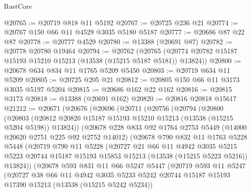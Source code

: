 \begin{lexlean}{RustCore}
\begin{coremodule}
@20765 := @20719 @818 @11 @5192
@20767 := @20725 @236 @21
@20774 := @20767 @150 @66 @11 @4529 @3035 @5180 @5187
@20777 := @20686 @87 @22 @87
@20778 := @20777 @4529
@20780 := @13388 (@20691 @87)
@20782 := @20778 @20780 @19464
@20794 := @20762
    (@20765 (@20774 @20782 @15187 @15193 @15210 @15213 (@13538 (@15215 @5187 @5181)) @13824))
@20800 := @20678 @634 @834 @11 @1765 @5209 @5450
@20803 := @20719 @634 @11 @5209
@20805 := @20725 @205 @21
@20812 := @20805 @150 @66 @11 @3173 @3035 @5197 @5204
@20815 := @20686 @162 @22 @162
@20816 := @20815 @3173
@20818 := @13388 (@20691 @162)
@20820 := @20816 @20818 @15617
@21212 := @20671
    (@20676
      (@20696
        (@20711
          (@20756
            (@20794
              (@20800
                (@20803
                  (@20812 @20820 @15187 @15193 @15210 @15213 (@13538 (@15215 @5204 @5198)) @13824))
                (@20678
                  @228
                  @833
                  @92
                  @1764
                  @2753
                  @5449
                  (@14000 @20620 @2751 @225 @92 @2752 @14012)
                  (@20678
                    @790
                    @832
                    @11
                    @1763
                    @5228
                    @5448
                    (@20719
                      @790
                      @11
                      @5228
                      (@20727
                        @21
                        @66
                        @11
                        @4942
                        @3035
                        @5215
                        @5223
                        @20744
                        @15187
                        @15193
                        @15853
                        @15213
                        (@13538 (@15215 @5223 @5216))
                        @13824))
                    (@20678
                      @593
                      @831
                      @11
                      @66
                      @5247
                      @5447
                      (@20719
                        @593
                        @11
                        @5247
                        (@20727
                          @38
                          @66
                          @11
                          @4942
                          @3035
                          @5233
                          @5242
                          @20744
                          @15187
                          @15193
                          @17390
                          @15213
                          (@13538 (@15215 @5242 @5234))

\end{coremodule}
\end{lexlean}
